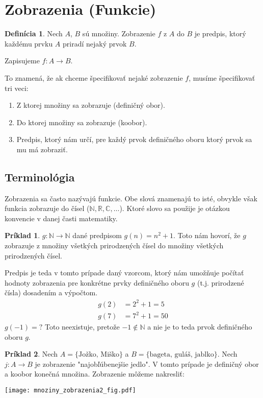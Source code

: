 \documentclass{article}
\theoremstyle{definition}
\newtheorem{definition}{Definícia}
\newtheorem{example}{Príklad}
\theoremstyle{plain}
\theoremstyle{remark}
\begin{document}
\section*{Zobrazenia (Funkcie)}

\begin{definition}\label{def:zobrazenie}
Nech $A$, $B$ sú množiny. Zobrazenie $f$ z $A$ do $B$ je predpis, ktorý každému prvku $A$ priradí nejaký prvok $B$.
\end{definition}

Zapisujeme $f \colon A \rightarrow B$.

To znamená, že ak chceme špecifikovať nejaké zobrazenie $f$, musíme špecifikovať tri veci:
\begin{enumerate}
    \item Z ktorej množiny sa zobrazuje (definičný obor).
    \item Do ktorej množiny sa zobrazuje (koobor).
    \item Predpis, ktorý nám určí, pre každý prvok definičného oboru ktorý prvok sa mu má zobraziť.
\end{enumerate}

\subsection*{Terminológia}
Zobrazenia sa často nazývajú funkcie. Obe slová znamenajú to isté, obvykle však funkcia zobrazuje do čísel ($\mathbb{N}, \mathbb{R}, \mathbb{C}, \dots$). Ktoré slovo sa použije je otázkou konvencie v danej časti matematiky.

\begin{example}
$g \colon \mathbb{N} \rightarrow \mathbb{N}$ dané predpisom $g(n) = n^2 + 1$.
Toto nám hovorí, že $g$ zobrazuje z množiny všetkých prirodzených čísel do množiny všetkých prirodzených čísel.

Predpis je teda v tomto prípade daný vzorcom, ktorý nám umožňuje počítať hodnoty zobrazenia pre konkrétne prvky definičného oboru $g$ (t.j. prirodzené čísla) dosadením a výpočtom.
\begin{align*}
    g(2) &= 2^2 + 1 = 5 \\
    g(7) &= 7^2 + 1 = 50
\end{align*}
$g(-1) = ?$ Toto neexistuje, pretože $-1 \notin \mathbb{N}$ a nie je to teda prvok definičného oboru $g$.
\end{example}

\begin{example}
Nech $A = \{\text{Jožko, Miško}\}$ a $B = \{\text{bageta, guláš, jablko}\}$.
Nech $j \colon A \rightarrow B$ je zobrazenie "najobľúbenejšie jedlo".
V tomto prípade je definičný obor a koobor konečná množina. Zobrazenie môžeme nakresliť:
\begin{center}
\texttt{[image: mnoziny\_zobrazenia2\_fig.pdf]}
\end{center}
\end{example}
\end{document}
